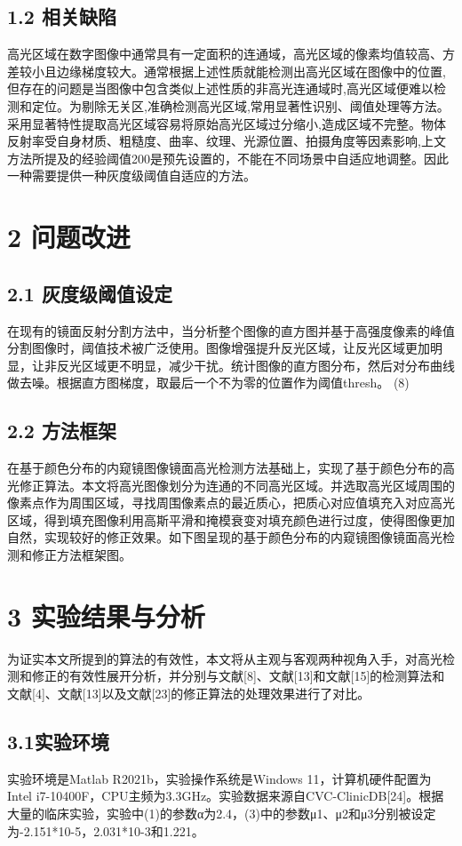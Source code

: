 \documentclass[UTF8,a4paper,12pt]{ctexart}
\begin{document}
 \subsection{1.2  相关缺陷}
高光区域在数字图像中通常具有一定面积的连通域，高光区域的像素均值较高、方差较小且边缘梯度较大。通常根据上述性质就能检测出高光区域在图像中的位置,但存在的问题是当图像中包含类似上述性质的非高光连通域时,高光区域便难以检测和定位。为剔除无关区,准确检测高光区域,常用显著性识别、阈值处理等方法。采用显著特性提取高光区域容易将原始高光区域过分缩小,造成区域不完整。物体反射率受自身材质、粗糙度、曲率、纹理、光源位置、拍摄角度等因素影响,上文方法所提及的经验阈值200是预先设置的，不能在不同场景中自适应地调整。因此一种需要提供一种灰度级阈值自适应的方法。


\section{2  问题改进}
\subsection{2.1  灰度级阈值设定}
在现有的镜面反射分割方法中，当分析整个图像的直方图并基于高强度像素的峰值分割图像时，阈值技术被广泛使用。图像增强提升反光区域，让反光区域更加明显，让非反光区域更不明显，减少干扰。统计图像的直方图分布，然后对分布曲线做去噪。根据直方图梯度，取最后一个不为零的位置作为阈值thresh。
                                   (8)
\subsection{2.2 方法框架}
在基于颜色分布的内窥镜图像镜面高光检测方法基础上，实现了基于颜色分布的高光修正算法。本文将高光图像划分为连通的不同高光区域。并选取高光区域周围的像素点作为周围区域，寻找周围像素点的最近质心，把质心对应值填充入对应高光区域，得到填充图像利用高斯平滑和掩模衰变对填充颜色进行过度，使得图像更加自然，实现较好的修正效果。如下图呈现的基于颜色分布的内窥镜图像镜面高光检测和修正方法框架图。

\section{3 实验结果与分析}
为证实本文所提到的算法的有效性，本文将从主观与客观两种视角入手，对高光检测和修正的有效性展开分析，并分别与文献[8]、文献[13]和文献[15]的检测算法和文献[4]、文献[13]以及文献[23]的修正算法的处理效果进行了对比。
\subsection{3.1实验环境}
实验环境是Matlab R2021b，实验操作系统是Windows 11，计算机硬件配置为Intel i7-10400F，CPU主频为3.3GHz。实验数据来源自CVC-ClinicDB[24]。根据大量的临床实验，实验中(1)的参数α为2.4，(3)中的参数μ1、μ2和μ3分别被设定为-2.151*10-5，2.031*10-3和1.221。
\end{document}
